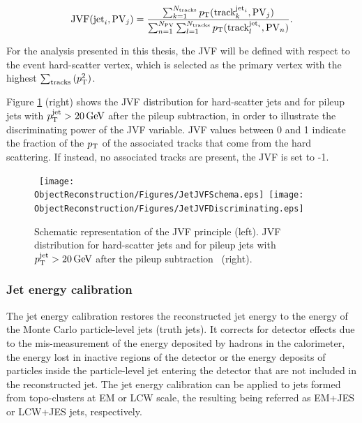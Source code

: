 \begin{equation}
\text{JVF}(\text{jet}_i, \text{PV}_j) = \frac{\sum_{k=1}^{N_\text{tracks}}{p_{\mathrm{T}}(\text{track}_{k}^{\text{jet}_i}, \text{PV}_j) }}{ \sum_{n=1}^{N_\text{PV}}{\sum_{l=1}^{N_\text{tracks}}{p_{\mathrm{T}}(\text{track}_{l}^{\text{jet}_i}, \text{PV}_n)} }}.
\label{eq:JetJVFDefinition}
\end{equation}

For the analysis presented in this thesis, the JVF will be defined with respect to the event hard-scatter vertex, which is selected as the primary vertex with the highest $\sum_{\text{tracks}}{(p_{\mathrm{T}}^2)}$.

Figure \ref{fig:JetPileup} (right) shows the JVF distribution for hard-scatter jets and for pileup jets with $\pt^{\text{jet}}>\unit[20]{GeV}$ after the pileup subtraction, in order to illustrate the discriminating power of the JVF variable.
JVF values between 0 and 1 indicate the fraction of the $p_{\mathrm{T}}$ of the associated tracks that come from the hard scattering.
If instead, no associated tracks are present, the JVF is set to -1.

\begin{figure}[!ht]
  \begin{center}
    \mbox{
      \texttt{[image: ObjectReconstruction/Figures/JetJVFSchema.eps]}
      \texttt{[image: ObjectReconstruction/Figures/JetJVFDiscriminating.eps]}
    }
  \end{center}
  \caption[Schematic representation of the JVF principle, and JVF distribution for hard-scatter jets and for pileup jets after the pileup subtraction.]{Schematic representation of the JVF principle (left). 
  JVF distribution for hard-scatter jets and for pileup jets with $\pt^{\text{jet}}>\unit[20]{GeV}$ after the pileup subtraction~\protect\cite{TheATLAScollaboration:2013pia} (right).}
  \label{fig:JetPileup}
\end{figure}


\subsubsection{Jet energy calibration}
    \label{subsubsec:JetEnergyCalibration}

The jet energy calibration restores the reconstructed jet energy to the energy of the Monte Carlo particle-level jets (truth jets).
It corrects for detector effects due to the mis-measurement of the energy deposited by hadrons in the calorimeter, the energy lost in inactive regions of the detector or the energy deposits of particles inside the particle-level jet entering the detector that are not included in the reconstructed jet.
The jet energy calibration can be applied to jets formed from topo-clusters at EM or LCW scale, the resulting being referred as EM+JES or LCW+JES jets, respectively.

